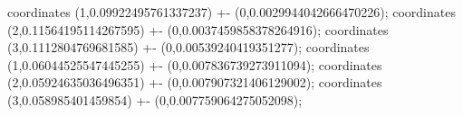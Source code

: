 coordinates {(1,0.09922495761337237) +- (0,0.0029944042666470226)};
coordinates {(2,0.11564195114267595) +- (0,0.0037459858378264916)};
coordinates {(3,0.1112804769681585) +- (0,0.00539240419351277)};
coordinates {(1,0.06044525547445255) +- (0,0.007836739273911094)};
coordinates {(2,0.05924635036496351) +- (0,0.007907321406129002)};
coordinates {(3,0.058985401459854) +- (0,0.007759064275052098)};
